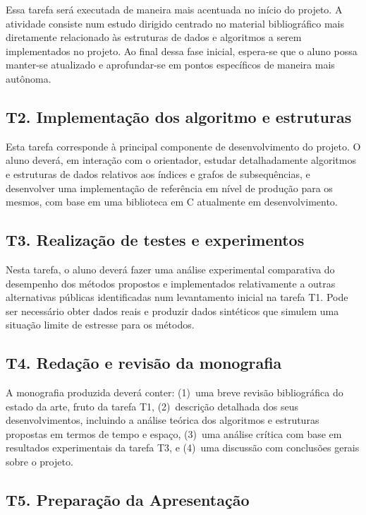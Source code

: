 \documentclass[12pt, a4paper, oneside]{article}
\begin{document}
Essa tarefa será executada de maneira mais acentuada no início do projeto. A atividade consiste num estudo dirigido centrado no  material bibliográfico mais diretamente relacionado às estruturas de dados e algoritmos a serem implementados no projeto. Ao final dessa fase inicial, espera-se que o aluno possa manter-se atualizado e aprofundar-se em pontos específicos de maneira mais autônoma.


\subsection*{T2. Implementação dos algoritmo e estruturas}

Esta tarefa corresponde à principal componente de desenvolvimento do projeto. O aluno deverá, em interação com o orientador, estudar detalhadamente algoritmos e estruturas de dados relativos aos índices e grafos de subsequências, e desenvolver uma implementação de referência em nível de produção para os mesmos, com base em uma biblioteca em C atualmente em desenvolvimento.


\subsection*{T3. Realização de testes e experimentos}

Nesta tarefa, o aluno deverá fazer uma análise experimental comparativa do desempenho dos métodos propostos e implementados relativamente a outras alternativas públicas identificadas num levantamento inicial na tarefa T1. Pode ser necessário obter dados reais e produzir dados sintéticos que simulem uma situação limite de estresse para os métodos.


\subsection*{T4. Redação e revisão da monografia}

A monografia produzida deverá conter:
(1)~uma breve revisão bibliográfica do estado da arte, fruto da tarefa T1, (2)~descrição detalhada dos seus desenvolvimentos, incluindo a análise teórica dos algoritmos e estruturas propostas em termos de tempo e espaço, (3)~uma análise crítica com base em resultados experimentais da tarefa T3, e (4)~uma discussão com conclusões gerais sobre o projeto.


\subsection*{T5. Preparação da Apresentação}
\end{document}
